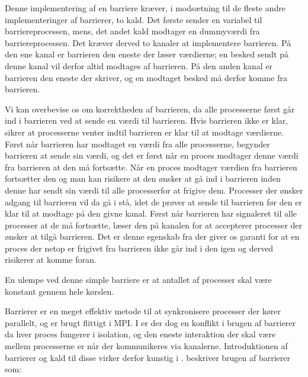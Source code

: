 Denne implementering af en barriere kræver, i modsætning til de fleste andre 
implementeringer af barrierer\cites{mpi-barrier, crew}, to kald. Det første 
sender en variabel til barriereprocessen, mens,
det andet kald modtager en dummyværdi fra barriereprocessen. Det kræver derved 
to kanaler at implementere barrieren. På den ene kanal er barrieren den eneste 
der læser værdierne; en besked sendt på denne kanal vil derfor altid modtages 
af barrieren. På den anden kanal er barrieren den eneste der skriver, og en 
modtaget besked må derfor komme fra barrieren.

Vi kan overbevise os om korrektheden af barrieren, da alle processerne først 
går ind i barrieren ved at sende en værdi til barrieren. Hvis barrieren ikke er 
klar, sikrer \csp at processerne venter indtil barrieren er klar til at modtage 
værdierne. Først når barrieren har modtaget en værdi fra alle processerne, 
begynder barrieren at sende sin værdi, og det er først når en proces modtager 
denne værdi fra barrieren at den må fortsætte. Når en proces modtager værdien 
fra barrieren fortsætter den og man kan risikere at den ønsker at gå ind i 
barrieren inden denne har sendt sin værdi til alle processerfor at frigive dem.
Processer der ønsker adgang til barrieren vil da gå i stå, idet de prøver at 
sende til barrieren før den er klar til at modtage på den givne kanal. Først 
når barrieren har signaleret til alle processer at de må fortsætte, læser den 
på kanalen for at accepterer processer der ønsker at tilgå barrieren. Det er 
denne egenskab fra \csp der giver os garanti for at en proces der netop er 
frigivet fra barrieren ikke går ind i den igen og derved risikerer at komme 
foran. 

En ulempe ved denne simple barriere er at antallet af processer skal være 
konstant gennem hele kørslen.



Barrierer er en meget effektiv metode til at synkronisere processer der kører 
parallelt, og er brugt flittigt i MPI. I \csp er der dog en konflikt i brugen 
af barrierer da hver proces fungerer i isolation, og den eneste interaktion der 
skal være mellem processerne er når der kommunikeres via kanalerne. 
Introduktionen af barrierer og kald til disse virker derfor kunstig i \csp. 
\citeauthor{crew} beskriver brugen af barrierer som:

